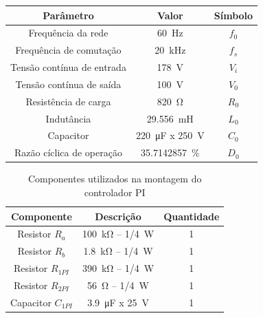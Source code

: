 \begin{center}
	\label{tab:parametrosBuckBoost}
	\begin{tabular}{@{}ccc@{}}
		\toprule
		\textbf{Parâmetro} & \textbf{Valor} & \textbf{Símbolo} \\ \midrule			
		Frequência  da rede        & \SI{60}{\hertz}     & $f_0$  \\		
		Frequência de comutação        & \SI{20}{\kilo\hertz}     & $f_s$  \\	
		Tensão contínua de entrada         &  \SI{178}{\V}      & $V_i$  \\
		Tensão contínua de saída         &  \SI{100}{\V}      & $V_0$  \\
		Resistência de carga        & \SI{820}{\ohm}      & $R_0$  \\
			Indutância        & \SI{29.556}{\milli\henry}     & $L_0$  \\
			Capacitor           & \SI{220}{\micro\farad} x \SI{250}{\V}      & $C_0$               \\
		Razão cíclica de operação       & \SI{35.7142857}{\%}    & $D_{0}$    \\  \bottomrule	
	\end{tabular}
\end{center}




\begin{table}[!ht]
	\centering
	\caption{Componentes utilizados na montagem do controlador PI}
	\label{tab:componentesPWM}
	\begin{tabular}{@{}ccc@{}}
		\toprule
		\textbf{Componente} & \textbf{Descrição} & \textbf{Quantidade} \\ \midrule			
		Resistor  $R_a$     & \SI{100}{\kilo\ohm} -- \SI{1/4}{\W}    & 1    \\	
		Resistor   $R_b$    & \SI{1.8}{\kilo\ohm} -- \SI{1/4}{\W}    & 1    \\
		Resistor  $R_{1PI}$     & \SI{390}{\kilo\ohm} -- \SI{1/4}{\W}    & 1     \\	     
		Resistor  $R_{2PI}$     & \SI{56}{\ohm} -- \SI{1/4}{\W}    & 1   \\  
	    Capacitor $C_{1PI}$     & \SI{3,9}{\micro\farad} x \SI{25}{\V}      & 1  \\\bottomrule	
	\end{tabular}
\end{table}





